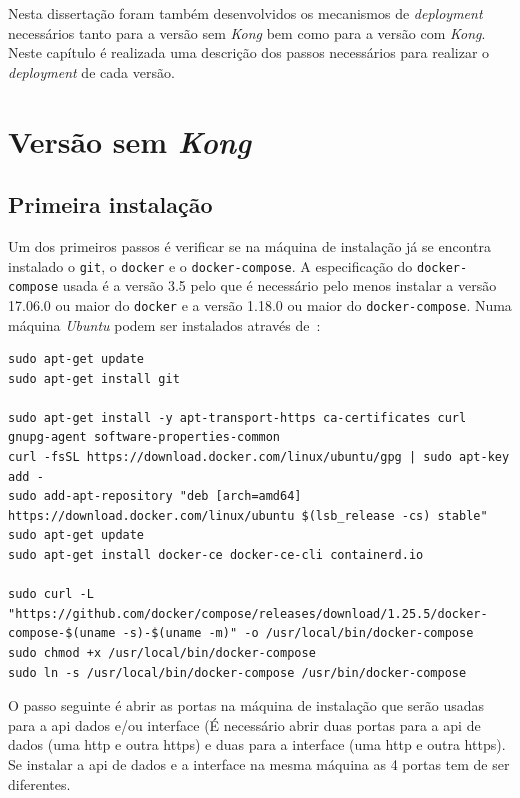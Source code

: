 Nesta dissertação foram também desenvolvidos os mecanismos de \textit{deployment} necessários tanto para a versão sem \textit{Kong} bem como para a versão com \textit{Kong}. Neste capítulo é realizada uma descrição dos passos necessários para realizar o \textit{deployment} de cada versão.

\section{Versão sem \textit{Kong}}\label{sec:deployNoKong}

\subsection{Primeira instalação}\label{sec:inst-prim}

Um dos primeiros passos é verificar se na máquina de instalação já se encontra instalado o \texttt{git}, o \texttt{docker} e o \texttt{docker-compose}. A especificação do \texttt{docker-compose} usada é a versão 3.5 pelo que é necessário pelo menos instalar a versão 17.06.0 ou maior do \texttt{docker} e a versão 1.18.0 ou maior do \texttt{docker-compose}. Numa máquina \textit{Ubuntu} podem ser instalados através de~\cite{installDocker,installDC}:
\begin{lstlisting}[caption=Instalar \textit{docker} e \textit{docker-compose}]
sudo apt-get update
sudo apt-get install git

sudo apt-get install -y apt-transport-https ca-certificates curl gnupg-agent software-properties-common
curl -fsSL https://download.docker.com/linux/ubuntu/gpg | sudo apt-key add -
sudo add-apt-repository "deb [arch=amd64] https://download.docker.com/linux/ubuntu $(lsb_release -cs) stable"
sudo apt-get update
sudo apt-get install docker-ce docker-ce-cli containerd.io

sudo curl -L "https://github.com/docker/compose/releases/download/1.25.5/docker-compose-$(uname -s)-$(uname -m)" -o /usr/local/bin/docker-compose
sudo chmod +x /usr/local/bin/docker-compose
sudo ln -s /usr/local/bin/docker-compose /usr/bin/docker-compose
\end{lstlisting}

O passo seguinte é abrir as portas na máquina de instalação que serão usadas para a \acrshort{api} dados e/ou interface (É necessário abrir duas portas para a \acrshort{api} de dados (uma \acrshort{http} e outra \acrshort{https}) e duas para a interface (uma \acrshort{http} e outra \acrshort{https}). Se instalar a \acrshort{api} de dados e a interface na mesma máquina as 4 portas tem de ser diferentes.

